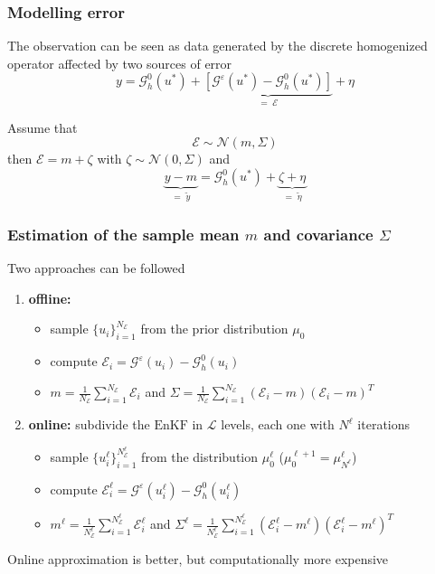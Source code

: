 \begin{frame}
\frametitle{Modelling error}
\begin{greenblock}
The observation can be seen as data generated by the discrete homogenized operator affected by two sources of error 
\begin{equation*}
y = \mathcal{G}^0_h(u^*) + \underbrace{[ \mathcal{G}^{\varepsilon}(u^*) - \mathcal{G}^0_h(u^*) ]}_{\textstyle = \;  \mathcal{E}} + \eta
\end{equation*}
\end{greenblock}

\vspace{0.5cm}
Assume that
\[ \mathcal{E} \sim \mathcal{N}(m,\Sigma) \]
then $\mathcal{E} = m + \zeta$ with $\zeta \sim \mathcal{N}(0,\Sigma)$ and
\begin{equation*}
\underbrace{y - m}_{\textstyle = \; \tilde{y}} = \mathcal{G}^0_h(u^*) + \underbrace{\zeta + \eta}_{\textstyle = \; \tilde{\eta}}
\end{equation*}
\end{frame}

\begin{frame}
\frametitle{Estimation of the sample mean $m$ and covariance $\Sigma$}
Two approaches can be followed
\begin{enumerate}%
\item<1-> \textbf{offline:} 
\begin{itemize}
\item{sample $\{ u_i \}_{i=1}^{N_{\mathcal{E}}}$ from the prior distribution $\mu_0$}
\item{compute $\mathcal{E}_i = \mathcal{G}^{\varepsilon}(u_i) - \mathcal{G}^0_h(u_i)$}
\item{$m = \frac{1}{N_{\mathcal{E}}} \sum_{i=1}^{N_{\mathcal{E}}} \mathcal{E}_i$ and $\Sigma = \frac{1}{N_{\mathcal{E}}} \sum_{i=1}^{N_{\mathcal{E}}} (\mathcal{E}_i - m) (\mathcal{E}_i - m)^T$}
\end{itemize}
\item<2-> \textbf{online:} subdivide the $\mathrm{EnKF}$ in $\mathcal{L}$ levels, each one with $N^{\ell}$ iterations
\begin{itemize}
\item{sample $\{ u_i^{\ell} \}_{i=1}^{N^{\ell}_{\mathcal{E}}}$ from the distribution $\mu_0^{\ell}$ ($\mu_0^{\ell+1} = \mu_{N^{\ell}}^{\ell}$)}
\item{compute $\mathcal{E}_i^{\ell} = \mathcal{G}^{\varepsilon}(u_i^{\ell}) - \mathcal{G}^0_h(u_i^{\ell})$}
\item{$m^{\ell} = \frac{1}{N_{\mathcal{E}}^{\ell}} \sum_{i=1}^{N_{\mathcal{E}}^{\ell}} \mathcal{E}_i^{\ell}$ and $\Sigma^{\ell} = \frac{1}{N_{\mathcal{E}}^{\ell}} \sum_{i=1}^{N_{\mathcal{E}}^{\ell}} (\mathcal{E}_i^{\ell} - m^{\ell}) (\mathcal{E}_i^{\ell} - m^{\ell})^T$}
\end{itemize}
\end{enumerate}
\begin{orangeblock}[Warning]
Online approximation is better, but computationally more expensive
\end{orangeblock}
\end{frame}

